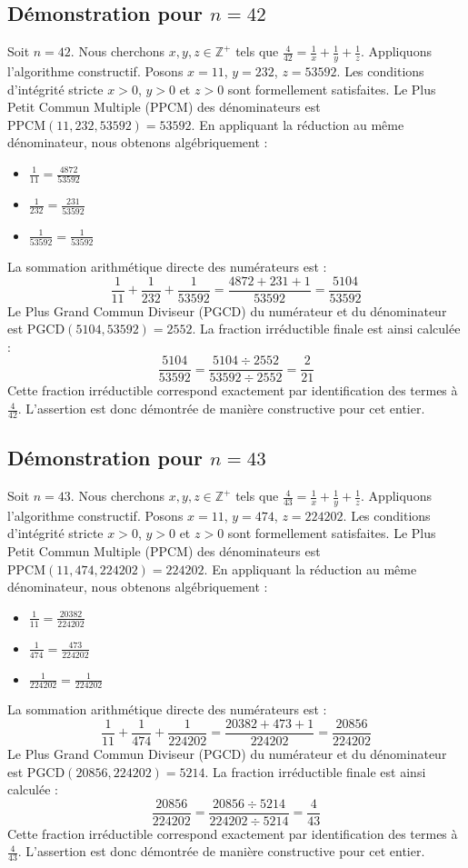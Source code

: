 \documentclass[11pt,a4paper]{article}
\begin{document}
\subsection{Démonstration pour $n = 42$}
Soit $n = 42$. Nous cherchons $x, y, z \in \mathbb{Z}^{+}$ tels que $\frac{4}{42} = \frac{1}{x} + \frac{1}{y} + \frac{1}{z}$.
Appliquons l'algorithme constructif. Posons $x = 11$, $y = 232$, $z = 53592$.
Les conditions d'intégrité stricte $x > 0$, $y > 0$ et $z > 0$ sont formellement satisfaites.
Le Plus Petit Commun Multiple (PPCM) des dénominateurs est $\text{PPCM}(11, 232, 53592) = 53592$.
En appliquant la réduction au même dénominateur, nous obtenons algébriquement :
\begin{itemize}
    \item $\frac{1}{11} = \frac{4872}{53592}$
    \item $\frac{1}{232} = \frac{231}{53592}$
    \item $\frac{1}{53592} = \frac{1}{53592}$
\end{itemize}
La sommation arithmétique directe des numérateurs est :
$$ \frac{1}{11} + \frac{1}{232} + \frac{1}{53592} = \frac{4872 + 231 + 1}{53592} = \frac{5104}{53592} $$
Le Plus Grand Commun Diviseur (PGCD) du numérateur et du dénominateur est $\text{PGCD}(5104, 53592) = 2552$.
La fraction irréductible finale est ainsi calculée :
$$ \frac{5104}{53592} = \frac{5104 \div 2552}{53592 \div 2552} = \frac{2}{21} $$
Cette fraction irréductible correspond exactement par identification des termes à $\frac{4}{42}$. L'assertion est donc démontrée de manière constructive pour cet entier.

\subsection{Démonstration pour $n = 43$}
Soit $n = 43$. Nous cherchons $x, y, z \in \mathbb{Z}^{+}$ tels que $\frac{4}{43} = \frac{1}{x} + \frac{1}{y} + \frac{1}{z}$.
Appliquons l'algorithme constructif. Posons $x = 11$, $y = 474$, $z = 224202$.
Les conditions d'intégrité stricte $x > 0$, $y > 0$ et $z > 0$ sont formellement satisfaites.
Le Plus Petit Commun Multiple (PPCM) des dénominateurs est $\text{PPCM}(11, 474, 224202) = 224202$.
En appliquant la réduction au même dénominateur, nous obtenons algébriquement :
\begin{itemize}
    \item $\frac{1}{11} = \frac{20382}{224202}$
    \item $\frac{1}{474} = \frac{473}{224202}$
    \item $\frac{1}{224202} = \frac{1}{224202}$
\end{itemize}
La sommation arithmétique directe des numérateurs est :
$$ \frac{1}{11} + \frac{1}{474} + \frac{1}{224202} = \frac{20382 + 473 + 1}{224202} = \frac{20856}{224202} $$
Le Plus Grand Commun Diviseur (PGCD) du numérateur et du dénominateur est $\text{PGCD}(20856, 224202) = 5214$.
La fraction irréductible finale est ainsi calculée :
$$ \frac{20856}{224202} = \frac{20856 \div 5214}{224202 \div 5214} = \frac{4}{43} $$
Cette fraction irréductible correspond exactement par identification des termes à $\frac{4}{43}$. L'assertion est donc démontrée de manière constructive pour cet entier.
\end{document}
